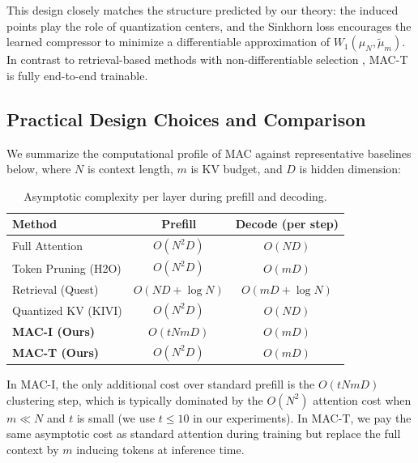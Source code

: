 \documentclass{article}
\theoremstyle{plain}
\theoremstyle{definition}
\theoremstyle{remark}
\newcommand{\muN}{\mu_N} %
\newcommand{\Wass}[1]{W_{#1}} %
\begin{document}
This design closely matches the structure predicted by our theory: the induced points
play the role of quantization centers, and the Sinkhorn loss encourages the learned
compressor to minimize a differentiable approximation of $\Wass{1}(\muN,\tilde\mu_m)$.
In contrast to retrieval-based methods with non-differentiable selection
\citep{tang2024quest,gao2024retrieval}, MAC-T is fully end-to-end trainable.

\subsection{Practical Design Choices and Comparison}
\label{sec:method_practical}

We summarize the computational profile of MAC against representative baselines below,
where $N$ is context length, $m$ is KV budget, and $D$ is hidden dimension:

\begin{table}[h]
\caption{Asymptotic complexity per layer during prefill and decoding.}
\label{tab:complexity}
\begin{center}
\begin{small}
\begin{sc}
\begin{tabular}{lcc}
\toprule
Method & Prefill & Decode (per step) \\
\midrule
Full Attention & $O(N^2 D)$ & $O(ND)$ \\
Token Pruning (H2O) & $O(N^2 D)$ & $O(mD)$ \\
Retrieval (Quest) & $O(ND + \log N)$ & $O(mD + \log N)$ \\
Quantized KV (KIVI) & $O(N^2 D)$ & $O(ND)$ \\
\textbf{MAC-I (Ours)} & $O(t N m D)$ & $O(mD)$ \\
\textbf{MAC-T (Ours)} & $O(N^2 D)$ & $O(mD)$ \\
\bottomrule
\end{tabular}
\end{sc}
\end{small}
\end{center}
\vspace{-8pt}
\end{table}

In MAC-I, the only additional cost over standard prefill is the $O(t N m D)$ clustering
step, which is typically dominated by the $O(N^2)$ attention cost when $m \ll N$ and
$t$ is small (we use $t \le 10$ in our experiments). In MAC-T, we pay the same asymptotic
cost as standard attention during training but replace the full context by $m$ inducing
tokens at inference time.
\end{document}
